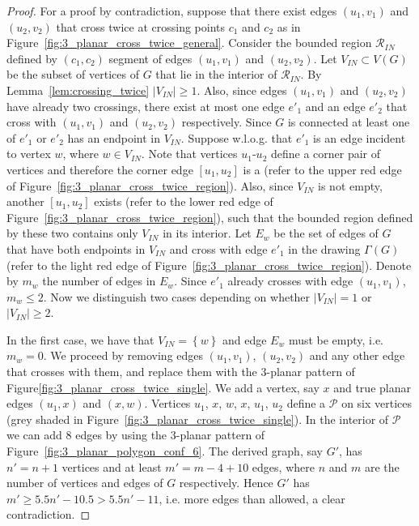 \begin{proof}
For a proof by contradiction, suppose that there exist edges $(u_1,v_1)$ and $(u_2,v_2)$ that cross twice at crossing points $c_1$ and $c_2$ as in Figure~\ref{fig:3_planar_cross_twice_general}. Consider the bounded region $\mathcal{R}_{IN}$ defined by $(c_1,c_2)$ segment of edges $(u_1,v_1)$ and $(u_2,v_2)$. Let $V_{IN}\subset V(G)$ be the subset of vertices of $G$ that lie in the interior of $\mathcal{R}_{IN}$. By Lemma~\ref{lem:crossing_twice} $|V_{IN}|\geq 1$. Also, since edges $(u_1,v_1)$ and $(u_2,v_2)$ have already two crossings, there exist at most one edge $e'_1$ and an edge $e'_2$ that cross with $(u_1,v_1)$ and $(u_2,v_2)$ respectively. Since $G$ is connected  at least one of $e'_1$ or $e'_2$ has an endpoint in $V_{IN}$. Suppose w.l.o.g. that $e'_1$ is an edge incident to vertex $w$, where $w\in V_{IN}$. Note that vertices $u_1$-$u_2$ define a corner pair of vertices and therefore the corner edge $[u_1,u_2]$ is a \pe (refer to the upper red edge of Figure~\ref{fig:3_planar_cross_twice_region}). Also, since $V_{IN}$ is not empty, another \pe $[u_1,u_2]$ exists (refer to the lower red edge of Figure~\ref{fig:3_planar_cross_twice_region}), such that the bounded region defined by these two \pes contains only $V_{IN}$ in its interior. Let $E_w$ be the set of edges of $G$ that have both endpoints in $V_{IN}$ and cross with edge $e'_1$ in the drawing $\Gamma(G)$ (refer to the light red edge of Figure~\ref{fig:3_planar_cross_twice_region}). Denote by $m_w$ the number of edges in $E_w$. Since $e'_1$ already crosses with edge $(u_1,v_1)$, $m_w\leq 2$. Now we distinguish two cases depending on whether $|V_{IN}|=1$ or $|V_{IN}|\geq 2$.

In the first case, we have that $V_{IN}=\left\{w\right\}$ and edge $E_w$ must be empty, i.e. $m_w=0$. We proceed by removing edges $(u_1,v_1)$, $(u_2,v_2)$ and any other edge that crosses with them, and replace them with the $3$-planar pattern of Figure\ref{fig:3_planar_cross_twice_single}. We add a vertex, say $x$ and true planar edges $(u_1,x)$ and $(x,w)$. Vertices $u_1$, $x$, $w$, $x$, $u_1$, $u_2$ define a \pp $\mathcal{P}$ on six vertices (grey shaded in Figure~\ref{fig:3_planar_cross_twice_single}). In the interior of $\mathcal{P}$ we can add $8$ edges by using the $3$-planar pattern of Figure~\ref{fig:3_planar_polygon_conf_6}. The derived graph, say $G'$, has $n'=n+1$ vertices and at least $m'=m-4+10$ edges, where $n$ and $m$ are the number of vertices and edges of $G$ respectively. Hence $G'$ has $m'\geq 5.5n'-10.5>5.5n'-11$, i.e. more edges than allowed, a clear contradiction.


\end{proof}
